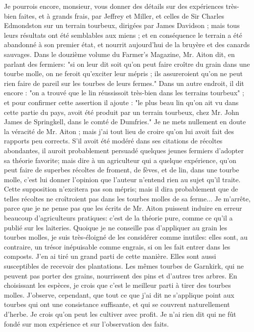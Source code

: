Je pourrois encore, monsieur, vous donner des détails sur des expériences très-bien faites, et à grands frais, par Jeffrey et Miller, et celles de Sir Charles Edmondston sur un terrain tourbeux, dirigées par James Davidson ; mais tous leurs résultats ont été semblables aux miens ; et en conséquence le terrain a été abandonné à son premier état, et nourrit aujourd'hui de la bruyère et des canards sauvages. Dans le douzième volume du Farmer's Magazine, Mr. Aiton dit, en parlant des fermiers: "si on leur dit soit qu'on peut faire croître du grain dans une tourbe molle, on ne feroit qu'exciter leur mépris ; ils assureroient qu'on ne peut rien faire de pareil sur les tourbes de leurs fermes." Dans un autre endroit, il dit encore : "on a trouvé que le lin réussissoit très-bien dans les terrains tourbeux" ; et pour confirmer cette assertion il ajoute : "le plus beau lin qu'on ait vu dans cette partie du pays, avoit été produit par un terrain tourbeux, chez Mr. John James de Springkell, dans le comté de Dumfries." Je ne mets nullement en doute la véracité de Mr. Aiton ;\setcounter{page}{461} mais j'ai tout lieu de croire qu'on lui avoit fait des rapports peu corrects. S'il avoit été modéré dans ses citations de récoltes abondantes, il auroit probablement persuadé quelques jeunes fermiers d'adopter sa théorie favorite; mais dire à un agriculteur qui a quelque expérience, qu'on peut faire de superbes récoltes de froment, de fèves, et de lin, dans une tourbe molle, c'est lui donner l'opinion que l'auteur n'entend rien au sujet qu'il traite. Cette supposition n'excitera pas son mépris; mais il dira probablement que de telles récoltes ne croîtroient pas dans les tourbes molles de sa ferme... Je m'arrête, parce que je ne pense pas que les écrits de Mr. Aiton puissent induire en erreur beaucoup d'agriculteurs pratiques: c'est de la théorie pure, comme ce qu'il a publié sur les laiteries.
Quoique je ne conseille pas d'appliquer au grain les tourbes molles, je suis très-éloigné de les considérer comme inutiles: elles sont, au contraire, un trésor inépuisable comme engrais, si on les fait entrer dans les composts. J'en ai tiré un grand parti de cette manière. Elles sont aussi susceptibles de recevoir des plantations. Les mêmes tourbes de Garnkirk, qui ne peuvent pas porter des grains, nourrissent des pins et d'autres\setcounter{page}{462} tres arbres. En choisissant les espèces, je crois que c'est le meilleur parti à tirer des tourbes molles. J'observe, cependant, que tout ce que j'ai dit ne s'applique point aux tourbes qui ont une consistance suffisante, et qui se couvrent naturellement d'herbe. Je crois qu'on peut les cultiver avec profit. Je n'ai rien dit qui ne fût fondé sur mon expérience et sur l'observation des faits.